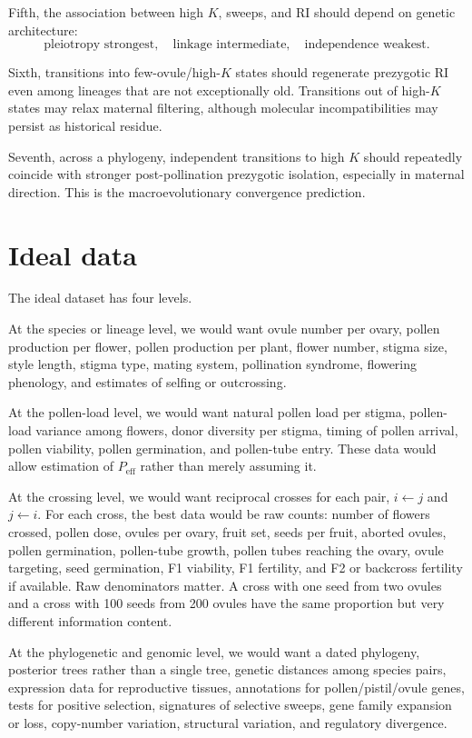 \documentclass[11pt]{article}
\newcommand{\Peff}{P_{\mathrm{eff}}}
\begin{document}
Fifth, the association between high \(K\), sweeps, and RI should depend on genetic architecture:
\begin{equation}
\text{pleiotropy strongest}, \quad \text{linkage intermediate}, \quad \text{independence weakest}.
\end{equation}

Sixth, transitions into few-ovule/high-\(K\) states should regenerate prezygotic RI even among lineages that are not exceptionally old. Transitions out of high-\(K\) states may relax maternal filtering, although molecular incompatibilities may persist as historical residue.

Seventh, across a phylogeny, independent transitions to high \(K\) should repeatedly coincide with stronger post-pollination prezygotic isolation, especially in maternal direction. This is the macroevolutionary convergence prediction.

\section{Ideal data}

The ideal dataset has four levels.

At the species or lineage level, we would want ovule number per ovary, pollen production per flower, pollen production per plant, flower number, stigma size, style length, stigma type, mating system, pollination syndrome, flowering phenology, and estimates of selfing or outcrossing.

At the pollen-load level, we would want natural pollen load per stigma, pollen-load variance among flowers, donor diversity per stigma, timing of pollen arrival, pollen viability, pollen germination, and pollen-tube entry. These data would allow estimation of \(\Peff\) rather than merely assuming it.

At the crossing level, we would want reciprocal crosses for each pair, \(i\leftarrow j\) and \(j\leftarrow i\). For each cross, the best data would be raw counts: number of flowers crossed, pollen dose, ovules per ovary, fruit set, seeds per fruit, aborted ovules, pollen germination, pollen-tube growth, pollen tubes reaching the ovary, ovule targeting, seed germination, F1 viability, F1 fertility, and F2 or backcross fertility if available. Raw denominators matter. A cross with one seed from two ovules and a cross with 100 seeds from 200 ovules have the same proportion but very different information content.

At the phylogenetic and genomic level, we would want a dated phylogeny, posterior trees rather than a single tree, genetic distances among species pairs, expression data for reproductive tissues, annotations for pollen/pistil/ovule genes, tests for positive selection, signatures of selective sweeps, gene family expansion or loss, copy-number variation, structural variation, and regulatory divergence.
\end{document}
